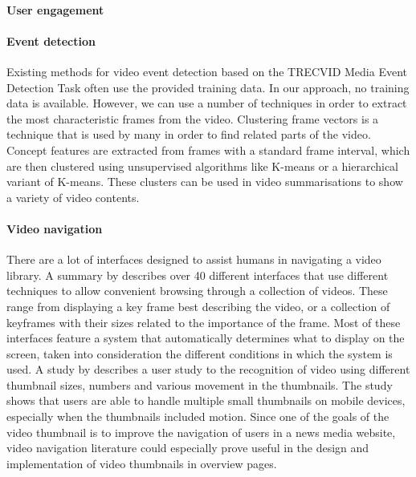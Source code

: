\documentclass{../resources/sig-alternate-05-2015}
\begin{document}
\paragraph{User engagement}
\label{section: user engagement}

\paragraph{Event detection}
Existing methods for video event detection based on the TRECVID Media Event Detection Task often use the provided training data. In our approach, no training data is available. However, we can use a number of techniques in order to extract the most characteristic frames from the video. Clustering frame vectors is a technique that is used by many in order to find related parts of the video. Concept features are extracted from frames with a standard frame interval, which are then clustered using unsupervised algorithms like K-means or a hierarchical variant of K-means. These clusters can be used in video summarisations to show a variety of video contents. 

\paragraph{Video navigation}
\label{section: video navigation}
There are a lot of interfaces designed to assist humans in navigating a video library. A summary by \textcite{Schoeffmann:2010iw} describes over 40 different interfaces that use different techniques to allow convenient browsing through a collection of videos. These range from displaying a key frame best describing the video, or a collection of keyframes with their sizes related to the importance of the frame. Most of these interfaces feature a system that automatically determines what to display on the screen, taken into consideration the different conditions in which the system is used. A study by \textcite{Hurst:2011jx} describes a user study to the recognition of video using different thumbnail sizes, numbers and various movement in the thumbnails. The study shows that users are able to handle multiple small thumbnails on mobile devices, especially when the thumbnails included motion. Since one of the goals of the video thumbnail is to improve the navigation of users in a news media website, video navigation literature could especially prove useful in the design and implementation of video thumbnails in overview pages.
\end{document}
